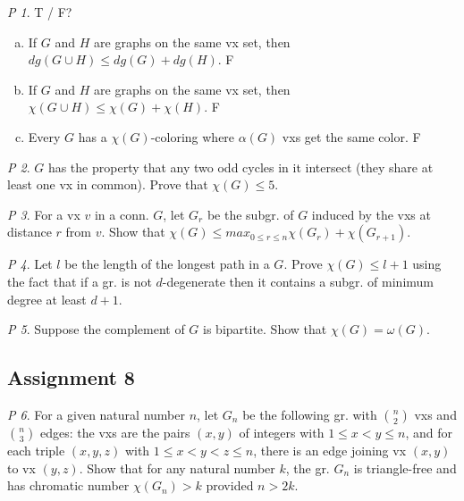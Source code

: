 \documentclass[11pt, fleqn, a4paper, landscape]{article}
\theoremstyle{plain} %
\theoremstyle{remark} %
\newtheorem{problem}{P}
\theoremstyle{definition} %
\begin{document}
\begin{multicols}{5}
\begin{problem}
T / F?
\begin{enumerate}[(a)]
\item If $G$ and $H$ are graphs on the same vx set, then $dg(G \cup H)\le dg(G) + dg(H)$. F
\item If $G$ and $H$ are graphs on the same vx set, then $\chi(G \cup H) \le \chi(G) + \chi(H)$. F
\item Every $G$ has a $\chi(G)$-coloring where $\alpha(G)$ vxs get the same color. F
\end{enumerate}
\end{problem}

\begin{problem}
$G$ has the property that any two odd cycles in it intersect (they share at least one vx in common). Prove that $\chi(G) \le 5.$
\end{problem}

\begin{problem}
For a vx $v$ in a conn. $G$, let $G_r$ be the subgr. of $G$ induced by the vxs at distance $r$ from $v$. Show that $\chi(G) \le max_{0\le r\le n}\chi(G_r) + \chi(G_{r+1})$.
\end{problem}

\begin{problem}
Let $l$ be the length of the longest path in a $G$. Prove $\chi(G)\le l + 1$ using the fact that if a gr. is not $d$-degenerate then it contains a subgr. of minimum degree at least $d + 1$.
\end{problem}

\begin{problem}
Suppose the complement of $G$ is bipartite. Show that $\chi(G) = \omega(G).$
\end{problem}

\subsection{Assignment 8}

\begin{problem}
For a given natural number $n$, let $G_n$ be the following gr. with $\binom{n}{2}$ vxs and $\binom{n}{3}$ edges: the vxs are the pairs $(x, y)$ of integers with $1\le x < y \le n$, and for each triple $(x, y, z)$ with $1\le x < y < z\le n$, there is an edge joining vx $(x, y)$ to vx $(y, z)$. Show that for any natural number $k$, the gr. $G_n$ is triangle-free and has chromatic number $\chi(G_n) > k$ provided $n > 2k$.
\end{problem}


\end{multicols}
\end{document}
